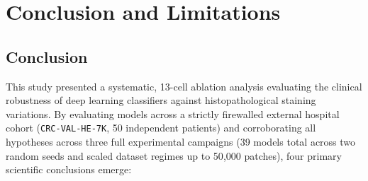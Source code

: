 \documentclass[11pt,a4paper]{article}
\begin{document}
\section{Conclusion and Limitations}

\subsection{Conclusion}
This study presented a systematic, 13-cell ablation analysis evaluating the clinical
robustness of deep learning classifiers against histopathological staining variations.
By evaluating models across a strictly firewalled external hospital cohort
(\texttt{CRC-VAL-HE-7K}, 50 independent patients) and corroborating all hypotheses
across three full experimental campaigns (39 models total across two random seeds and
scaled dataset regimes up to 50{,}000 patches), four primary scientific conclusions
emerge:
\end{document}
